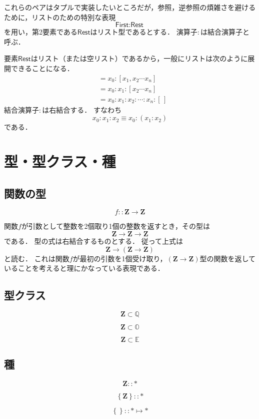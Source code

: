 \documentclass[twocolumn]{jsbook}
\newcommand{\concretetype}{\mathbf\ast} %
\newcommand{\typename}[1]{\bm{#1}}
\newcommand{\integertype}{\typename{Z}}
\newcommand{\typeclassname}[1]{\mathbb{#1}}
\newcommand{\enumtypeclass}{\typeclassname{E}}
\newcommand{\eqtypeclass}{\typeclassname{Q}}
\newcommand{\ordtypeclass}{\typeclassname{O}}
\newcommand{\maybe}[1]{\left\{#1\right\}}
\newcommand{\specialkeyword}[1]{\textsf{#1}}
\newcommand{\firstelem}{\specialkeyword{First}}
\newcommand{\restelems}{\specialkeyword{Rest}}
\begin{document}
これらのペアはタプルで実装したいところだが，参照，逆参照の煩雑さを避けるために，リストのための特別な表現$$\firstelem:\restelems$$を用い，第2要素である$\restelems$はリスト型であるとする．
演算子$:$は結合演算子と呼ぶ．

要素$\restelems$はリスト（または空リスト）であるから，一般にリストは次のように展開できることになる．
\begin{align*}
[x_0,x_1,x_2\dotsb x_n]&=x_0:[x_1,x_2\dotsb x_n]\\
&=x_0:x_1:[x_2\dotsb x_n]\\
&=x_0:x_1:x_2:\dotsb:x_n:[\,]
\end{align*}
結合演算子$:$は右結合する．
すなわち$$x_0:x_1:x_2\equiv x_0:(x_1:x_2)$$である．

\chapter{型・型クラス・種}

\section{関数の型}

$$f::\integertype\rightarrow\integertype$$

関数$f$が引数として整数を2個取り1個の整数を返すとき，その型は$$\integertype\rightarrow\integertype\rightarrow\integertype$$である．
型の式は右結合するものとする．
従って上式は$$\integertype\rightarrow\left(\integertype\rightarrow\integertype\right)$$と読む．
これは関数$f$が最初の引数を1個受け取り，$(\integertype\rightarrow\integertype)$型の関数を返していることを考えると理にかなっている表現である．

\section{型クラス}

$$\integertype\subset\eqtypeclass$$

$$\integertype\subset\ordtypeclass$$

$$\integertype\subset\enumtypeclass$$


\section{種}

$$\integertype::\concretetype$$

$$\maybe{\integertype}::\concretetype$$

$$\maybe{{}}::\concretetype\mapsto\concretetype$$
\end{document}
